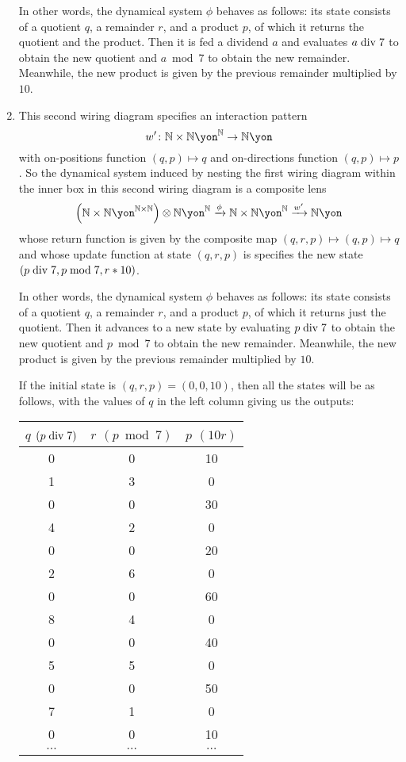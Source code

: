 \documentclass[Book-Poly]{subfiles}
\begin{document}
\begin{exercise}
\begin{solution}
\begin{enumerate}
    In other words, the dynamical system $\phi$ behaves as follows: its state consists of a quotient $q$, a remainder $r$, and a product $p$, of which it returns the quotient and the product.
    Then it is fed a dividend $a$ and evaluates $a\bdiv7$ to obtain the new quotient and $a\bmod7$ to obtain the new remainder.
    Meanwhile, the new product is given by the previous remainder multiplied by $10$.
    
    \item This second wiring diagram specifies an interaction pattern
    \[
        w'\colon\nn\times\nn\yon^\nn\to\nn\yon
    \]
    with on-positions function $(q,p)\mapsto q$ and on-directions function $(q,p)\mapsto p$.
    So the dynamical system induced by nesting the first wiring diagram within the inner box in this second wiring diagram is a composite lens
    \[
        \left(\nn\times\nn\yon^{\nn\times\nn}\right)\otimes\nn\yon^\nn\To{\phi}\nn\times\nn\yon^\nn\To{w'}\nn\yon
    \]
    whose return function is given by the composite map $(q,r,p)\mapsto(q,p)\mapsto q$ and whose update function at state $(q,r,p)$ is specifies the new state $(p\bdiv7,p\bmod7,r*10)$.
    
    In other words, the dynamical system $\phi$ behaves as follows: its state consists of a quotient $q$, a remainder $r$, and a product $p$, of which it returns just the quotient.
    Then it advances to a new state by evaluating $p\bdiv7$ to obtain the new quotient and $p\bmod7$ to obtain the new remainder.
    Meanwhile, the new product is given by the previous remainder multiplied by $10$.
    
    If the initial state is $(q,r,p)=(0,0,10)$, then all the states will be as follows, with the values of $q$ in the left column giving us the outputs:
    \begin{table}[hbt!]
        \centering
        \footnotesize
        \begin{tabular}{c|c|c}
            $q$ $(p\bdiv7)$ & $r$ $(p\bmod7)$ & $p$ $(10r)$ \\
            \hline
            0 & 0 & 10 \\
            1 & 3 & 0 \\
            0 & 0 & 30 \\
            4 & 2 & 0 \\
            0 & 0 & 20 \\
            2 & 6 & 0 \\
            0 & 0 & 60 \\
            8 & 4 & 0 \\
            0 & 0 & 40 \\
            5 & 5 & 0 \\
            0 & 0 & 50 \\
            7 & 1 & 0 \\
            0 & 0 & 10 \\
            $\cdots$ & $\cdots$ & $\cdots$
        \end{tabular}
    \end{table}
\end{enumerate}
\end{solution}
\end{exercise}
\end{document}
